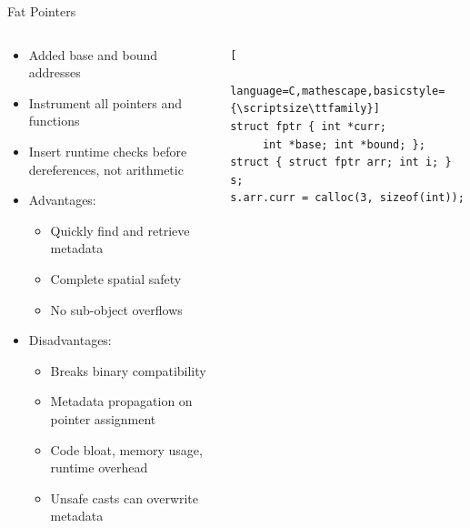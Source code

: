 \documentclass[aspectratio=169]{beamer}
\begin{document}
\begin{frame}[fragile]{Fat Pointers}
  \footnotesize
\vspace{-0.1in}
\pause
\begin{columns}[T]
\begin{column}{0.64\textwidth}
\begin{itemize}[<+->]
 \item Added base and bound addresses 
 \item Instrument all pointers and functions
 \item Insert runtime checks \alert{before dereferences}, not arithmetic 
 \item Advantages:
     \begin{itemize}
        \item Quickly find and retrieve metadata 
        \item Complete spatial safety 
        \item No sub-object overflows 
     \end{itemize}
 \item Disadvantages:
     \begin{itemize}
        \item Breaks binary compatibility 
        \item Metadata propagation on pointer assignment
        \item Code bloat, memory usage, runtime overhead 
        \item Unsafe casts can overwrite metadata
     \end{itemize}
\end{itemize}
\end{column}

\begin{column}{0.47\textwidth}

   \pause

\begin{lstlisting}[
    language=C,mathescape,basicstyle={\scriptsize\ttfamily}]
struct fptr { int *curr;
     int *base; int *bound; };
struct { struct fptr arr; int i; } s;
s.arr.curr = calloc(3, sizeof(int));
\end{lstlisting}


\end{column}
\end{columns}
\end{frame}
\end{document}
